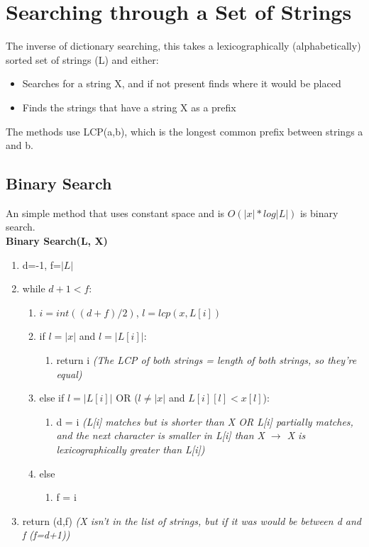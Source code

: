\section{Searching through a Set of Strings}
The inverse of dictionary searching, this takes a lexicographically (alphabetically) sorted set of strings (L) and either:
\begin{itemize}
    \item Searches for a string X, and if not present finds where it would be placed
    \item Finds the strings that have a string X as a prefix
\end{itemize}
The methods use LCP(a,b), which is the longest common prefix between strings a and b.

\subsection{Binary Search}
An simple method that uses constant space and is $O(|x|*log|L|)$ is binary search.\\
\textbf{Binary Search(L, X)} 
\begin{enumerate}[label=\Alph*]
    \item d=-1, f=$|L|$
    \item while $d+1<f$:
\begin{enumerate}[label=\arabic*]
    \item \(i = int((d+f)/2)\), \( l = lcp(x,L[i]) \)
    \item if $l= |x|$ and $l= |L[i]|$:
 \begin{enumerate}
    \item [] return i \emph{(The LCP of both strings = length of both strings, so they're equal)}
\end{enumerate} 
    \item [] else if $l= |L[i]|$ OR ($l\neq |x|$ and $L[i][l] < x[l]$):
 \begin{enumerate}
    \item [] d = i \emph{(L[i] matches but is shorter than X OR L[i] partially matches, and the next character is smaller in L[i] than X $\rightarrow$ X is lexicographically greater than L[i])}
\end{enumerate} 
    \item [] else 
 \begin{enumerate}
    \item [] f = i 
\end{enumerate} 
\end{enumerate}  
\item return (d,f) \emph{(X isn't in the list of strings, but if it was would be between d and f (f=d+1))}
\end{enumerate}

